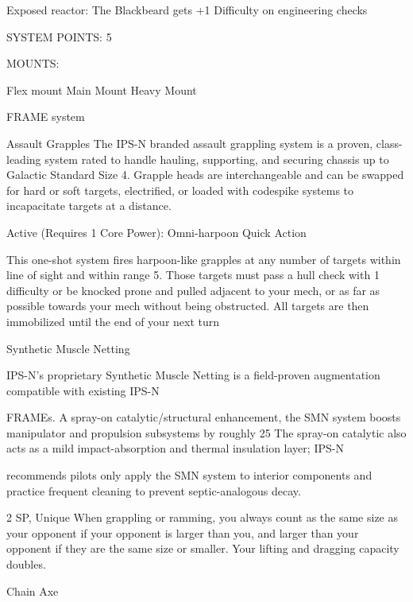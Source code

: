   Exposed reactor: The Blackbeard gets +1 Difficulty on engineering checks

                                               SYSTEM POINTS: 5

                                                     MOUNTS:

  Flex mount                          Main Mount                             Heavy Mount

                                                  FRAME system




                                                   Assault Grapples
   The IPS-N branded assault grappling system is a proven, class-leading system rated to handle hauling,
  supporting, and securing chassis up to Galactic Standard Size 4. Grapple heads are interchangeable
  and can be swapped for hard or soft targets, electrified, or loaded with codespike systems to
  incapacitate targets at a distance.


  Active (Requires 1 Core Power): Omni-harpoon
   Quick Action

  This one-shot system fires harpoon-like grapples at any number of targets within line of sight and within
   range 5. Those targets must pass a hull check with 1 difficulty or be knocked prone and pulled adjacent
  to your mech, or as far as possible towards your mech without being obstructed. All targets are then
   immobilized until the end of your next turn

Synthetic Muscle Netting

IPS-N’s proprietary Synthetic Muscle Netting is a field-proven augmentation compatible with existing IPS-N

FRAMEs. A spray-on catalytic/structural enhancement, the SMN system boosts manipulator and
propulsion subsystems by roughly 25%
The spray-on catalytic also acts as a mild impact-absorption and thermal insulation layer; IPS-N

recommends pilots only apply the SMN system to interior components and practice frequent cleaning to
prevent septic-analogous decay.

2 SP, Unique
When grappling or ramming, you always count as the same size as your opponent if your
opponent is larger than you, and larger than your opponent if they are the same size or smaller.
Your lifting and dragging capacity doubles.


Chain Axe

